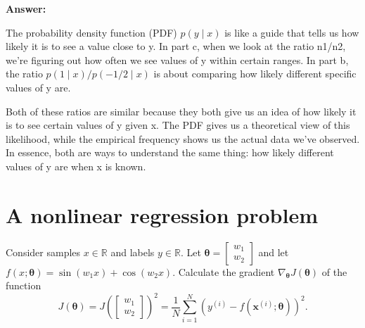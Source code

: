 \documentclass{article}
\newcommand{\mypart}[2]{\noindent{\textbf{[#1] point(s) --- #2:}}}
\begin{document}
\begin{tcolorbox}
\textbf{Answer: }


The probability density function (PDF) $p(y \mid x) $ is like a guide that tells us how likely it is to see a value close to y. In part c, when we look at the ratio n1/n2, we're figuring out how often we see values of y within certain ranges. In part b, the ratio $ p(1 \mid x) / p(-1/2 \mid x) $ is about comparing how likely different specific values of y are.

Both of these ratios are similar because they both give us an idea of how likely it is to see certain values of y given x. The PDF gives us a theoretical view of this likelihood, while the empirical frequency shows us the actual data we’ve observed. In essence, both are ways to understand the same thing: how likely different values of y are when x is known.


\end{tcolorbox}

\section{A nonlinear regression problem}
\mypart{3}{part a}
Consider samples \(x \in \mathbb{R}\) and labels \(y \in \mathbb{R}\).
Let \(\bm{\theta} =
\begin{bmatrix}
  w_{1} \\ w_{2}
\end{bmatrix}
\)
and let \(f({x} ; \bm{\theta})
=
\sin(w_{1}x) + \cos(w_{2} x)
\).
Calculate the gradient \(\nabla_{\bm{\theta}} J(\bm{\theta})\) of the function
\[
  J(\bm{\theta})
  =
  J\left(
  \begin{bmatrix}
    w_{1}\\w_{2}
  \end{bmatrix}
\right  )^{2}
  =
  \frac{1}{N}
  \sum_{i=1}^{N} (y^{(i)} - f(\mathbf{x}^{(i)} ; \bm{\theta}))^{2}.
\]
\end{document}
